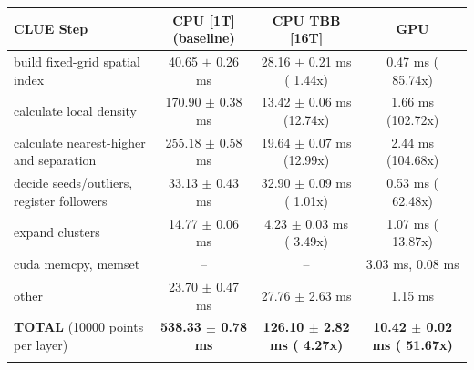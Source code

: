     \begin{tabular}{l|c|c|c}
    \hline
    CLUE Step                                 & CPU [1T] (baseline)         & CPU TBB [16T]                         & GPU                       \\ \hline
    build fixed-grid spatial index            &  40.65 $\pm$  0.26 ms       &  28.16 $\pm$  0.21 ms ( 1.44x)        &   0.47 ms ( 85.74x)       \\
    calculate local density                   & 170.90 $\pm$  0.38 ms       &  13.42 $\pm$  0.06 ms (12.74x)        &   1.66 ms (102.72x)       \\
    calculate nearest-higher and separation   & 255.18 $\pm$  0.58 ms       &  19.64 $\pm$  0.07 ms (12.99x)        &   2.44 ms (104.68x)       \\
    decide seeds/outliers, register followers &  33.13 $\pm$  0.43 ms       &  32.90 $\pm$  0.09 ms ( 1.01x)        &   0.53 ms ( 62.48x)       \\
    expand clusters                           &  14.77 $\pm$  0.06 ms       &   4.23 $\pm$  0.03 ms ( 3.49x)        &   1.07 ms ( 13.87x)       \\ \hline
    cuda memcpy, memset                       & --                          & --                                    &   3.03 ms,   0.08 ms      \\
    other                                     &  23.70 $\pm$  0.47 ms       &  27.76 $\pm$  2.63 ms                 &   1.15 ms                 \\ \hline
    \textbf{TOTAL} (10000 points per layer)   & \textbf{538.33 $\pm$  0.78 ms} & \textbf{126.10 $\pm$  2.82 ms ( 4.27x)} & \textbf{ 10.42 $\pm$  0.02 ms ( 51.67x)}  \\
    \hline
    \multicolumn{4}{c}{}
    \end{tabular}
    \linebreak
